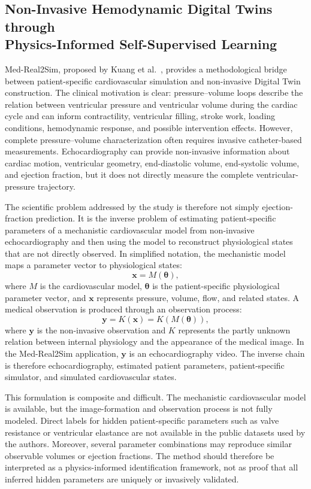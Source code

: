 \subsection[Non-Invasive Hemodynamic Digital Twins through Physics-Informed Self-Supervised Learning]{Non-Invasive Hemodynamic Digital Twins through\\ Physics-Informed Self-Supervised Learning}
\label{sec:medreal2sim}
Med-Real2Sim, proposed by Kuang et al.~\cite{kuang2024medreal2sim}, provides a methodological bridge between patient-specific cardiovascular simulation and non-invasive Digital Twin construction. The clinical motivation is clear: pressure--volume loops describe the relation between ventricular pressure and ventricular volume during the cardiac cycle and can inform contractility, ventricular filling, stroke work, loading conditions, hemodynamic response, and possible intervention effects. However, complete pressure--volume characterization often requires invasive catheter-based measurements. Echocardiography can provide non-invasive information about cardiac motion, ventricular geometry, end-diastolic volume, end-systolic volume, and ejection fraction, but it does not directly measure the complete ventricular-pressure trajectory.

The scientific problem addressed by the study is therefore not simply ejection-fraction prediction. It is the inverse problem of estimating patient-specific parameters of a mechanistic cardiovascular model from non-invasive echocardiography and then using the model to reconstruct physiological states that are not directly observed. In simplified notation, the mechanistic model maps a parameter vector to physiological states:
\[
\mathbf{x}=M(\boldsymbol{\theta}),
\]
where \(M\) is the cardiovascular model, \(\boldsymbol{\theta}\) is the patient-specific physiological parameter vector, and \(\mathbf{x}\) represents pressure, volume, flow, and related states. A medical observation is produced through an observation process:
\[
\mathbf{y}=K(\mathbf{x})=K(M(\boldsymbol{\theta})),
\]
where \(\mathbf{y}\) is the non-invasive observation and \(K\) represents the partly unknown relation between internal physiology and the appearance of the medical image. In the Med-Real2Sim application, \(\mathbf{y}\) is an echocardiography video. The inverse chain is therefore echocardiography, estimated patient parameters, patient-specific simulator, and simulated cardiovascular states.

This formulation is composite and difficult. The mechanistic cardiovascular model is available, but the image-formation and observation process is not fully modeled. Direct labels for hidden patient-specific parameters such as valve resistance or ventricular elastance are not available in the public datasets used by the authors. Moreover, several parameter combinations may reproduce similar observable volumes or ejection fractions. The method should therefore be interpreted as a physics-informed identification framework, not as proof that all inferred hidden parameters are uniquely or invasively validated.

